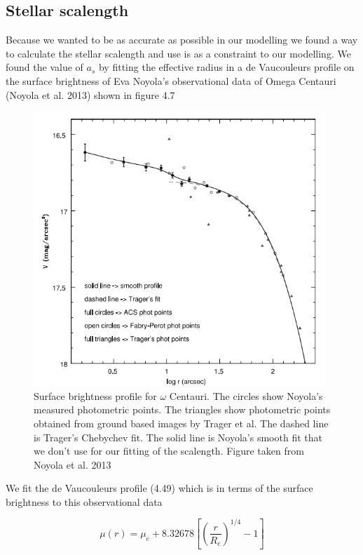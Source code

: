 \subsection{Stellar scalength}

Because we wanted to be as accurate as possible in our modelling we found a way to calculate the stellar scalength and use is as a constraint to our modelling. We found the value of $a_{s}$ by fitting the effective radius in a de Vaucouleurs profile on the surface brightness of Eva Noyola's observational data of Omega Centauri (Noyola et al. 2013) shown in figure 4.7

\begin{figure}[H]
\centering
\includegraphics[width=11cm]{images/noyola.png}
\caption[Surface brightness profile of Omega Centauri]{Surface brightness profile for $\omega$ Centauri. The circles show Noyola's measured photometric points. The triangles show photometric points obtained from ground based images by Trager et al. The dashed line is Trager’s Chebychev fit. The solid line is Noyola's smooth fit that we don't use for our fitting of the scalength. Figure taken from Noyola et al. 2013}
\end{figure}

We fit the de Vaucouleurs profile (4.49) which is in terms of the surface brightness to this observational data 

\begin{equation}
\mu(r)=\mu_{e}+8.32678\left[\left(\frac{r}{R_{e}}\right)^{1/4}-1\right]
\end{equation}

